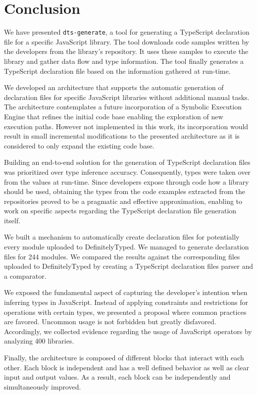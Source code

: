 \documentclass[a4paper,english,cleveref, autoref]{lipics-v2019}
\begin{document}
\section{Conclusion}
\label{sec:conclusion}
We have presented \texttt{dts-generate}, a tool for generating a TypeScript declaration file for a specific JavaScript library. The tool downloads code samples written by the developers from the library's repository. It uses these samples to execute the library and gather data flow and type information. The tool finally generates a TypeScript declaration file based on the information gathered at run-time.

We developed an architecture that supports the automatic generation of declaration files for specific JavaScript libraries without additional manual tasks. The architecture contemplates a future incorporation of a Symbolic Execution Engine that refines the initial code base enabling the exploration of new execution paths. However not implemented in this work, its incorporation would result in small incremental modifications to the presented architecture as it is considered to only expand the existing code base.

Building an end-to-end solution for the generation of TypeScript declaration files was prioritized over type inference accuracy. Consequently, types were taken over from the values at run-time. Since developers expose through code how a library should be used, obtaining the types from the code examples extracted from the repositories proved to be a pragmatic and effective approximation, enabling to work on specific aspects regarding the TypeScript declaration file generation itself.

We built a mechanism to automatically create declaration files for potentially every module uploaded to DefinitelyTyped. We managed to generate declaration files for 244 modules. We compared the results against the corresponding files uploaded to DefinitelyTyped by creating a TypeScript declaration files parser and a comparator.

We exposed the fundamental aspect of capturing the developer's intention when inferring types in JavaScript. Instead of applying constraints and restrictions for operations with certain types, we presented a proposal where common practices are favored. Uncommon usage is not forbidden but greatly disfavored. Accordingly, we collected evidence regarding the usage of JavaScript operators by analyzing 400 libraries.

Finally, the architecture is composed of different blocks that interact with each other. Each block is independent and has a well defined behavior as well as clear input and output values. As a result, each block can be independently and simultaneously improved.



\end{document}
